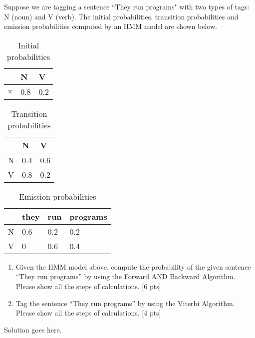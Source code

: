 Suppose we are tagging a sentence ``They run programs" with two types of tags: N (noun) and V (verb). The initial probabilities, transition probabilities and emission probabilities computed by an HMM model are shown below.

\begin{table}[h]
\centering
\begin{tabular}{|l|l|l|}
\hline
       & N & V  \\ \hline
$\pi$  & 0.8   & 0.2      \\ \hline
\end{tabular}\caption{Initial probabilities} \label{Tab:Initial}
\end{table}

\begin{table}[h]
\centering
\begin{tabular}{|l|l|l|}
\hline
       & N & V  \\ \hline
N  & 0.4   & 0.6      \\ \hline
V  & 0.8   & 0.2      \\ \hline
\end{tabular}\caption{Transition probabilities} \label{Tab:Trans}
\end{table}

\begin{table}[h]
\centering
\begin{tabular}{|l|l|l|l|}
\hline
       & they & run & programs  \\ \hline
N  & 0.6   & 0.2  &0.2      \\ \hline
V  & 0   & 0.6  &0.4      \\ \hline
\end{tabular}\caption{Emission probabilities} \label{Tab:Emission}
\end{table}

\begin{enumerate}
    \item Given the HMM model above, compute the probability of the given sentence ``They run programs'' by using the Forward AND Backward Algorithm. Please show all the steps of calculations.  
    [6 pts]
    \item Tag the sentence  ``They run programs'' by using the Viterbi Algorithm. Please show all the steps of calculations. [4 pts]
\end{enumerate}

\begin{solution}
Solution goes here.
\end{solution}